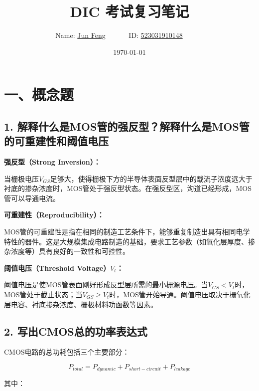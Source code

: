 \documentclass[UTF8,12pt,a4paper]{ctexart}
\title{DIC 考试复习笔记}
\author{
	Name: \underline{Jun Feng}~~~~~~
	ID: \underline{523031910148}~~~~~~}
\date{\today}
\begin{document}
\fancyfoot[C]{\thepage}

\maketitle

\section*{一、概念题}

\subsection*{1. 解释什么是MOS管的强反型？解释什么是MOS管的可重建性和阈值电压}

\textbf{强反型（Strong Inversion）：}

当栅极电压$V_{GS}$足够大，使得栅极下方的半导体表面反型层中的载流子浓度远大于衬底的掺杂浓度时，MOS管处于强反型状态。在强反型区，沟道已经形成，MOS管可以导通电流。

\textbf{可重建性（Reproducibility）：}

MOS管的可重建性是指在相同的制造工艺条件下，能够重复制造出具有相同电学特性的器件。这是大规模集成电路制造的基础，要求工艺参数（如氧化层厚度、掺杂浓度等）具有良好的一致性和可控性。

\textbf{阈值电压（Threshold Voltage）$V_t$：}

阈值电压是使MOS管表面刚好形成反型层所需的最小栅源电压。当$V_{GS} < V_t$时，MOS管处于截止状态；当$V_{GS} \geq V_t$时，MOS管开始导通。阈值电压取决于栅氧化层电容、衬底掺杂浓度、栅极材料功函数等因素。

\subsection*{2. 写出CMOS总的功率表达式}

CMOS电路的总功耗包括三个主要部分：

\begin{equation}
P_{total} = P_{dynamic} + P_{short-circuit} + P_{leakage}
\end{equation}

其中：
\end{document}
